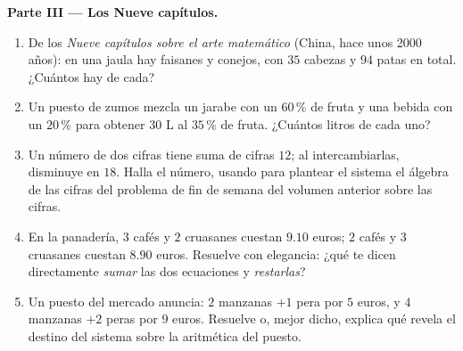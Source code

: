 \begin{problem}
\medskip
\noindent\textbf{Parte III --- Los Nueve capítulos.}
\begin{enumerate}[resume]
  \item De los \emph{Nueve capítulos sobre el arte matemático} (China,
        hace unos 2000 años): en una jaula hay faisanes y conejos, con
        $35$ cabezas y $94$ patas en total. ¿Cuántos hay de cada?
  \item Un puesto de zumos mezcla un jarabe con un $60\,\%$ de fruta y una
        bebida con un $20\,\%$ para obtener $30$ L al $35\,\%$ de fruta.
        ¿Cuántos litros de cada uno?
  \item Un número de dos cifras tiene suma de cifras $12$; al
        intercambiarlas, disminuye en $18$. Halla el número, usando para
        plantear el sistema el álgebra de las cifras del problema de fin
        de semana del volumen anterior sobre las cifras.
  \item En la panadería, $3$ cafés y $2$ cruasanes cuestan $9.10$ euros;
        $2$ cafés y $3$ cruasanes cuestan $8.90$ euros. Resuelve con
        elegancia: ¿qué te dicen directamente \emph{sumar} las dos
        ecuaciones y \emph{restarlas}?
  \item Un puesto del mercado anuncia: $2$ manzanas $+ 1$ pera por $5$
        euros, y $4$ manzanas $+ 2$ peras por $9$ euros. Resuelve o, mejor
        dicho, explica qué revela el destino del sistema sobre la
        aritmética del puesto.
\end{enumerate}


\end{problem}
